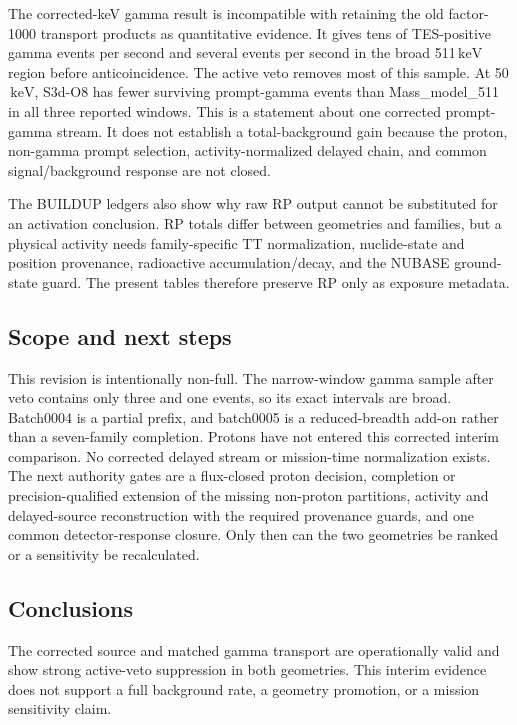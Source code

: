 \documentclass[11pt]{article}
\newcommand{\keV}{\ensuremath{\,\mathrm{keV}}}
\begin{document}
The corrected-keV gamma result is incompatible with retaining the old
factor-1000 transport products as quantitative evidence. It gives tens of
TES-positive gamma events per second and several events per second in the
broad 511\keV{} region before anticoincidence. The active veto removes most of
this sample. At 50\keV{}, S3d-O8 has fewer surviving prompt-gamma events than
Mass\_model\_511 in all three reported windows. This is a statement about one
corrected prompt-gamma stream. It does not establish a total-background gain
because the proton, non-gamma prompt selection, activity-normalized delayed
chain, and common signal/background response are not closed.

The BUILDUP ledgers also show why raw RP output cannot be substituted for an
activation conclusion. RP totals differ between geometries and families, but a
physical activity needs family-specific TT normalization, nuclide-state and
position provenance, radioactive accumulation/decay, and the NUBASE
ground-state guard. The present tables therefore preserve RP only as exposure
metadata.

\subsection{Scope and next steps}
\label{subsec:limitations}

This revision is intentionally non-full. The narrow-window gamma sample after
veto contains only three and one events, so its exact intervals are broad.
Batch0004 is a partial prefix, and batch0005 is a reduced-breadth add-on rather
than a seven-family completion. Protons have not entered this corrected
interim comparison. No corrected delayed stream or mission-time normalization
exists. The next authority gates are a flux-closed proton decision, completion
or precision-qualified extension of the missing non-proton partitions,
activity and delayed-source reconstruction with the required provenance
guards, and one common detector-response closure. Only then can the two
geometries be ranked or a sensitivity be recalculated.

\subsection{Conclusions}
\label{sec:conclusions}

The corrected source and matched gamma transport are operationally valid and
show strong active-veto suppression in both geometries. This interim evidence
does not support a full background rate, a geometry promotion, or a mission
sensitivity claim.
\end{document}
